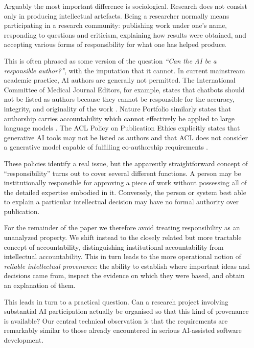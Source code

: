 \documentclass[12pt]{article}
\begin{document}
Arguably the most important difference is sociological. Research does not consist only in producing intellectual artefacts. Being a researcher normally means participating in a research community: publishing work under one's name, responding to questions and criticism, explaining how results were obtained, and accepting various forms of responsibility for what one has helped produce.

This is often phrased as some version of the question \emph{``Can the AI be a responsible author?''}, with the imputation that it cannot. In current mainstream academic practice, AI authors are generally not permitted. The International Committee of Medical Journal Editors, for example, states that chatbots should not be listed as authors because they cannot be responsible for the accuracy, integrity, and originality of the work \citep{icmje2026ai}. Nature Portfolio similarly states that authorship carries accountability which cannot effectively be applied to large language models \citep{nature2026ai}. The ACL Policy on Publication Ethics explicitly states that generative AI tools may not be listed as authors and that ACL does not consider a generative model capable of fulfilling co-authorship requirements \citep{acl2026policy}.

These policies identify a real issue, but the apparently straightforward concept of ``responsibility'' turns out to cover several different functions. A person may be institutionally responsible for approving a piece of work without possessing all of the detailed expertise embodied in it. Conversely, the person or system best able to explain a particular intellectual decision may have no formal authority over publication.

For the remainder of the paper we therefore avoid treating responsibility as an unanalyzed property. We shift instead to the closely related but more tractable concept of accountability, distinguishing institutional accountability from intellectual accountability. This in turn leads to the more operational notion of \emph{reliable intellectual provenance}: the ability to establish where important ideas and decisions came from, inspect the evidence on which they were based, and obtain an explanation of them.

This leads in turn to a practical question. Can a research project involving substantial AI participation actually be organised so that this kind of provenance is available? Our central technical observation is that the requirements are remarkably similar to those already encountered in serious AI-assisted software development.
\end{document}
